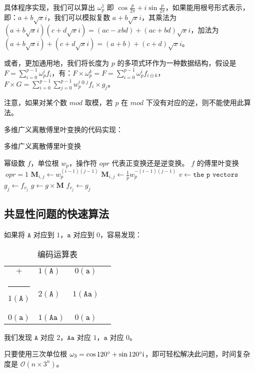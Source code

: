 \documentclass{article}
\makeatletter
\def\hlinewd#1{%
\noalign{\ifnum0=`}\fi\hrule \@height #1 %
\futurelet\reserved@a\@xhline}
\makeatother
\begin{document}
具体程序实现，我们可以算出 $\omega_p^1$ 即 $\cos \frac{p}{2\pi} + i\sin \frac{p}{2\pi}$，如果能用根号形式表示，即：$a+b\sqrt{x}i$，我们可以模拟复数 $a+b\sqrt{x}i$，其乘法为 $(a+b\sqrt{x}i)(c+d\sqrt{x}i)=(ac-xbd)+(ac+bd)\sqrt{x}i$，加法为 $(a+b\sqrt xi)+(c+d\sqrt xi)=(a+b)+(c+d)\sqrt xi$。

或者，更加通用地，我们将长度为 $p$ 的多项式环作为一种数据结构，假设是 $F=\sum_{i=0}^{p-1} \omega_p^i f_i$，有：$F \times \omega_p^k=F=\sum_{i=0}^{p-1} \omega_p^i f_{i\ominus k}$，$F \times G=\sum_{i=0}^{p-1} \sum_{j=0}^{p-1} w_p^{i \oplus j} f_i \times g_j$。

注意，如果对某个数 $mod$ 取模，若 $p$ 在 $mod$ 下没有对应的逆，则不能使用此算法。

多维广义离散傅里叶变换的代码实现：

\begin{algorithm}
	\caption{多维广义离散傅里叶变换}
	\begin{algorithmic}[1]
		\Require 幂级数 $f$，单位根 $w_p$，操作符 $opr$ 代表正变换还是逆变换。
		\Ensure $f$ 的傅里叶变换
			\If $\ opr=1$
				\State $\textbf{M}_{i,j} \gets w^{(i-1)(j-1)}_p$
			\Else
				\State $\textbf{M}_{i,j} \gets \frac{1}{p}w^{-(i-1)(j-1)}_p$
			\EndIf
					\State $v \gets \texttt{the p vectors}$
						\State $g_j \gets f_{v_j}$
					\EndFor
					\State $g \gets g \times \textbf{M}$
						\State $f_{v_j} \gets g_j$
					\EndFor
				\EndFor
			\EndFor
			\State {}
		\EndFunction
	\end{algorithmic}
\end{algorithm}

\subsection{共显性问题的快速算法}

如果将 $\texttt{A}$ 对应到 $1$，$\texttt{a}$ 对应到 $0$，容易发现：

\begin{table}[htbp]
	\centering
	\caption{编码运算表}
	\begin{tabular}{cV{3}c|c}
		$+$ & $1(\texttt{A})$ & $0(\texttt{a})$\\ \hlinewd{1pt}
		$1(\texttt{A})$ & $2(\texttt{A})$ & $1(\texttt{Aa})$\\ \hline
		$0(\texttt{a})$ & $1(\texttt{Aa})$ & $0(\texttt{a})$\\
	\end{tabular}
\end{table}

我们发现 $\texttt{A}$ 对应 $2$，$\texttt{Aa}$ 对应 $1$，$\texttt{a}$ 对应 $0$。

只要使用三次单位根 $\omega_3=\cos 120^\circ + \sin 120^\circ \rm i$，即可轻松解决此问题，时间复杂度是 $\mathcal O(n \times 3^n)$。
\end{document}
